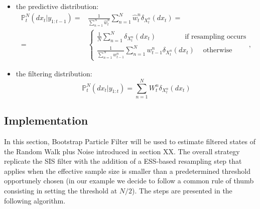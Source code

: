 \documentclass[
]{book}
\theoremstyle{break}
\theoremstyle{nonumberplain}
\begin{document}
\begin{itemize}
    \item the predictive distribution:
    \begin{equation}
    \begin{split}
        \mathbb P_t^N (dx_t|y_{1:t-1})=&\frac{1}{\sum_{n=1}^N\hat w_t^n}\sum_{n=1}^N\hat w_t^n\delta_{X_t^n}(dx_t)=\\
        =&\begin{cases}
        \frac{1}{N}\sum_{n=1}^N\delta_{X_t^n}(dx_t)
        ~~~~~~~~~~~~~~~~ ~\text{ if resampling occurs}\\
        \frac{1}{\sum_{n=1}^N w_{t-1}^n}\sum_{n=1}^Nw_{t-1}^n\delta_{X_t^n}(dx_t)~~~~ \text{ otherwise}
        \end{cases},
        \end{split}
    \end{equation}
    \item the filtering distribution:
    \begin{equation}
        \mathbb P_t^N (dx_t|y_{1:t})=\sum_{n=1}^NW_t^n\delta_{X_t^n}(dx_t)
    \end{equation}
\end{itemize}

\subsection{Implementation}

In this section, Bootstrap Particle Filter will be used to estimate
filtered states of the Random Walk plus Noise introduced in section XX.
The overall strategy replicate the SIS filter with the addition of a
ESS-based resampling step that applies when the effective sample size is
smaller than a predetermined threshold opportunely chosen (in our
example we decide to follow a common rule of thumb consisting in setting
the threshold at \(N/2\)). The steps are presented in the following
algorithm.
\end{document}
